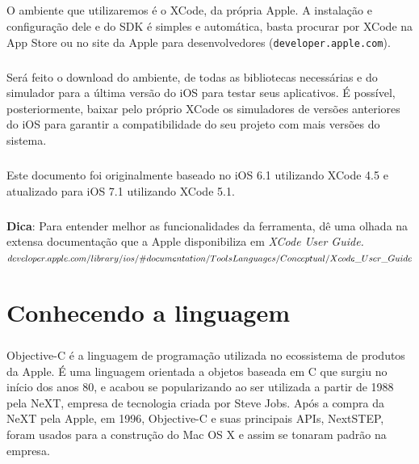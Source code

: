 \documentclass[a4paper,12pt,brazil,doubleside]{book}
\begin{document}
\begin{singlespace}
\paragraph{}O ambiente que utilizaremos é o XCode, da própria Apple. A instalação e configuração dele e do SDK é simples e automática, basta procurar por XCode na App Store ou no site da Apple para desenvolvedores (\texttt{developer.apple.com}).
\paragraph{}Será feito o download do ambiente, de todas as bibliotecas necessárias e do simulador para a última versão do iOS para testar seus aplicativos. É possível, posteriormente, baixar pelo próprio XCode os simuladores de versões anteriores do iOS para garantir a compatibilidade do seu projeto com mais versões do sistema.\\
\paragraph{}Este documento foi originalmente baseado no iOS 6.1 utilizando XCode 4.5 e atualizado para iOS 7.1 utilizando XCode 5.1.

\bigskip

\begin{framed}
\paragraph{}\textbf{Dica}: Para entender melhor as funcionalidades da ferramenta, dê uma olhada na extensa documentação que a Apple disponibiliza em 
\textit{XCode User Guide.\\
\(developer.apple.com/library/ios/\#documentation/ToolsLanguages/Conceptual/\\Xcode\_User\_Guide\)}
\end{framed}

\chapter{Conhecendo a linguagem}

\paragraph{}Objective-C é a linguagem de programação utilizada no ecossistema de produtos da Apple. É uma linguagem orientada a objetos baseada em C que surgiu no início dos anos 80, e acabou se popularizando ao ser utilizada a partir de 1988 pela NeXT, empresa de tecnologia criada por Steve Jobs. Após a compra da NeXT pela Apple, em 1996, Objective-C e suas principais APIs, NextSTEP, foram usados para a construção do Mac OS X e assim se tonaram padrão na empresa.

\end{singlespace}
\end{document}
